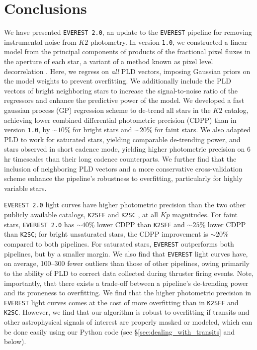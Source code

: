 \documentclass[]{emulateapj}
\newcommand{\Kp}{\ensuremath{Kp}}
\newcommand{\edited}[1]{{\color{red} #1}}
\begin{document}
\section{Conclusions}
\label{sec:conclusions}
We have presented \texttt{EVEREST 2.0}, an update to the \texttt{EVEREST} pipeline
\citep{Luger16} for removing instrumental noise from $K2$ photometry. In version
\texttt{1.0}, we constructed a linear model from the principal components of
products of the fractional pixel fluxes in the aperture of each star, a variant
of a method known as pixel level decorrelation \citep[PLD,][]{Deming15}. Here,
we regress on \emph{all} PLD vectors, imposing Gaussian priors on the model
weights to prevent overfitting. We additionally include the PLD vectors of bright
neighboring stars to increase the signal-to-noise ratio of the regressors and
enhance the predictive power of the model. We developed a fast gaussian process (GP)
regression scheme to de-trend all stars in the $K2$ catalog, achieving lower
combined differential photometric precision (CDPP) than in version \texttt{1.0},
by ${\sim}10\%$ for bright stars and ${\sim}20\%$ for faint stars. We also
adapted PLD to work for saturated stars, yielding comparable de-trending power,
and stars observed in short cadence mode, yielding higher photometric precision
on 6 hr timescales than their long cadence counterparts.
We further find that the inclusion of neighboring PLD vectors and a
more conservative cross-validation scheme enhance the pipeline's robustness
to overfitting, particularly for highly variable stars.

\texttt{EVEREST 2.0} light curves have higher photometric precision than the two
other publicly available catalogs, \texttt{K2SFF} \citep{VanderburgJohnson14}
and \texttt{K2SC} \citep{Aigrain16}, at all $\Kp$ magnitudes. For faint stars,
\texttt{EVEREST 2.0} has ${\sim}40\%$ lower CDPP than \texttt{K2SFF} and
${\sim}25\%$ lower CDPP than \texttt{K2SC}; for bright unsaturated stars, the CDPP
improvement is ${\sim}20\%$ compared to both pipelines. For saturated stars,
\texttt{EVEREST} outperforms both pipelines, but by a smaller margin. We also
find that \texttt{EVEREST} light curves have, on average, 100--300 fewer outliers
than those of other pipelines, owing primarily to the ability of PLD to correct
data collected during thruster firing events. \edited{Note, importantly, that there
exists a trade-off between a pipeline's de-trending power and its proneness
to overfitting. We find that the higher photometric precision in \texttt{EVEREST}
light curves comes at the cost of more overfitting than in \texttt{K2SFF} and
\texttt{K2SC}. However, we find that our algorithm is robust to overfitting
if transits and other astrophysical signals of interest
are properly masked or modeled, which can be done easily using our
Python code (see \S\ref{sec:dealing_with_transits} and below).}
\end{document}
